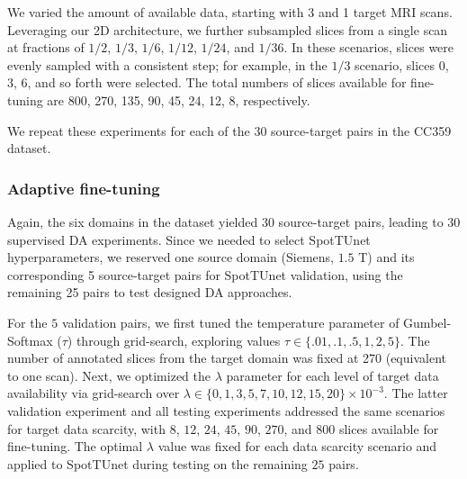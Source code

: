 We varied the amount of available data, starting with 3 and 1 target MRI scans. Leveraging our 2D architecture, we further subsampled slices from a single scan at fractions of $1/2$, $1/3$, $1/6$, $1/12$, $1/24$, and $1/36$. In these scenarios, slices were evenly sampled with a consistent step; for example, in the $1/3$ scenario, slices 0, 3, 6, and so forth were selected. The total numbers of slices available for fine-tuning are 800, 270, 135, 90, 45, 24, 12, 8, respectively.

We repeat these experiments for each of the 30 source-target pairs in the CC359 dataset.


\subsubsection{Adaptive fine-tuning}

Again, the six domains in the dataset yielded $30$ source-target pairs, leading to $30$ supervised DA experiments. Since we needed to select SpotTUnet hyperparameters, we reserved one source domain (Siemens, $1.5$ T) and its corresponding 5 source-target pairs for SpotTUnet validation, using the remaining 25 pairs to test designed DA approaches.

For the $5$ validation pairs, we first tuned the temperature parameter of Gumbel-Softmax ($\tau$) through grid-search, exploring values $\tau \in \{ .01, .1 , .5, 1, 2, 5 \}$. The number of annotated slices from the target domain was fixed at 270 (equivalent to one scan). Next, we optimized the $\lambda$ parameter for each level of target data availability via grid-search over $\lambda \in \{0, 1, 3 , 5, 7, 10, 12, 15, 20 \} \times 10^{-3}$. The latter validation experiment and all testing experiments addressed the same scenarios for target data scarcity, with $8$, $12$, $24$, $45$, $90$, $270$, and $800$ slices available for fine-tuning. The optimal $\lambda$ value was fixed for each data scarcity scenario and applied to SpotTUnet during testing on the remaining $25$ pairs.


